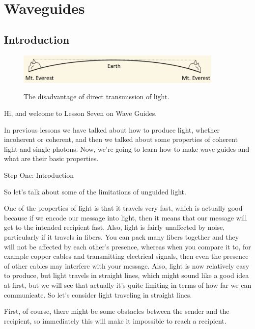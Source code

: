 \chapter{Waveguides}

\section{Introduction}

\begin{figure}[H]
    \centering
    \includegraphics[width=0.9\textwidth]{lesson7/everest.pdf}
    \label{図: 1}
    \caption{The disadvantage of direct transmission of light.}
\end{figure}

Hi, and welcome to Lesson Seven on Wave Guides.

In previous lessons we have talked about how to produce light, whether incoherent or coherent, and then we talked about some properties of coherent light and single photons. Now, we're going to learn how to make wave guides and what are their basic properties.

Step One: Introduction

So let's talk about some of the limitations of unguided light.

One of the properties of light is that it travels very fast, which is actually good because if we encode our message into light, then it means that our message will get to the intended recipient fast. Also, light is fairly unaffected by noise, particularly if it travels in fibers. You can pack many fibers together and they will not be affected by each other's presence, whereas when you compare it to, for example copper cables and transmitting electrical signals, then even the presence of other cables may interfere with your message. Also, light is now relatively easy to produce, but light travels in straight lines, which might sound like a good idea at first, but we will see that actually it's quite limiting in terms of how far we can communicate. So let's consider light traveling in straight lines.

First, of course, there might be some obstacles between the sender and the recipient, so immediately this will make it impossible to reach a recipient.

